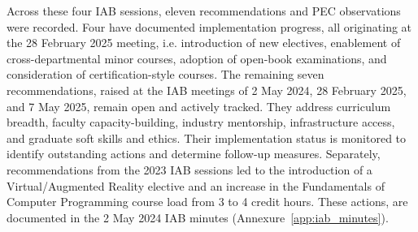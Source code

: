 Across these four IAB sessions, eleven recommendations and PEC observations were recorded. Four have documented implementation progress, all originating at the 28 February 2025 meeting, i.e. introduction of new electives, enablement of cross-departmental minor courses, adoption of open-book examinations, and consideration of certification-style courses. %
The remaining seven recommendations, raised at the IAB meetings of 2 May 2024, 28 February 2025, and 7 May 2025, remain open and actively tracked. They address curriculum breadth, faculty capacity-building, industry mentorship, infrastructure access, and graduate soft skills and ethics. Their implementation status is monitored to identify outstanding actions and determine follow-up measures. Separately, recommendations from the 2023 IAB sessions led to the introduction of a Virtual/Augmented Reality elective and an increase in the Fundamentals of Computer Programming course load from 3 to 4 credit hours. These actions, are documented in the 2 May 2024 IAB minutes (Annexure~\ref{app:iab_minutes}). 


